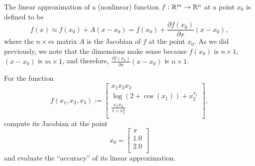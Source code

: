 \vspace*{0.2cm}
\begin{tcolorbox}[title=\textbf{Linear Approximation at a Point for Functions of Vectors}]
The linear approximation of a (nonlinear) function $f:\mathbb R^m \to \mathbb R^n $ at a point $x_0$ is defined to be
 \begin{equation}
     \label{eq:DefineVectorLinearApprox}
     f(x) \approx f(x_0) + A ( x - x_0) = f(x_0) + \frac{\partial f(x_0)}{\partial x} ( x - x_0),
 \end{equation}
 where the $n \times m$ matrix $A$ is the Jacobian of $f$ at the point $x_0$. As we did previously, we note that the dimensions make sense because $f(x_0)$ is $n \times 1$, $( x - x_0)$ is $m \times 1$, and therefore, $\frac{\partial f(x_0)}{\partial x}  ( x - x_0)$ is $n \times 1$. 
\end{tcolorbox}


\begin{example}
 \label{ex:Jacobianbb}
 For the function 
 \begin{equation}
 \label{eq:fR3ToR3bb}
 f(x_1,x_2,x_3):= 
 \left[
\begin{array}{c}
x_1 x_2 x_3  \\
\log(2+\cos(x_1)) + x_2^{x_1} \\
 \frac{x_1 x_3}{1+ x_2^2} \\
\end{array}
\right],
 \end{equation}
 compute its Jacobian at the point 
 $$x_0 = \left[
\begin{array}{c}
\pi \\
1.0 \\
2.0 \\
\end{array}
\right]$$
and evaluate the ``accuracy'' of its linear approximation.

  \end{example}
 
